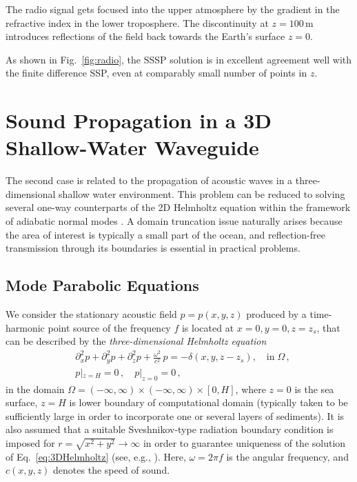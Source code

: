 \documentclass[11pt,a4paper]{article}
\theoremstyle{plain}%
\theoremstyle{definition}
\theoremstyle{remark}
\begin{document}
The radio signal gets focused into the upper atmosphere by the gradient in the refractive index in the lower troposphere.
The discontinuity at $z=100$\,m introduces reflections of the field back towards the Earth's surface $z=0$.

As shown in Fig.~\ref{fig:radio}, the SSSP solution is in excellent agreement well with the finite difference SSP, even at comparably small number of points in $z$.


\section{Sound Propagation in a 3D Shallow-Water Wave\-guide}\label{sec:sw_acoust}
The second case is related to the propagation of acoustic waves in a three-dimensional shallow water environment. 
This problem can be reduced to solving several one-way counterparts of the 2D Helmholtz equation within the framework of adiabatic normal modes \cite{jensen2011computational, PETROV2020115526}. 
A domain truncation issue naturally arises because the area of interest is typically a small part of the ocean, and reflection-free transmission through its boundaries is essential in practical problems.

\subsection{Mode Parabolic Equations}\label{sec:2MPE}

We consider the stationary acoustic field $p=p(x,y,z)$ produced by a time-harmonic point source of the frequency $f$ is located at $x=0, y=0, z=z_s$, that can be described by the \textit{three-dimensional Helmholtz equation} \cite{jensen2011computational}
\begin{equation}
    \begin{split}\label{eq:3DHelmholtz}
       &\partial_x^2 p + \partial_y^2 p + \partial_z^2 p + \frac{\omega^2}{c^2}  \,p
        = -\delta(x, y, z-z_s), \quad \mathrm{in}\; \Omega\,,\\
        & p|_{z=H} = 0\,,\quad p|_{z=0} = 0\,,
    \end{split}
\end{equation}
in the domain $\Omega = (-\infty,\infty) \times (-\infty, \infty) \times [0,H]$, 
where $z=0$ is the sea surface, $z=H$ is lower boundary of computational domain
(typically taken to be sufficiently large in order to incorporate one or several layers of sediments). 
It is also assumed that a suitable Sveshnikov-type radiation boundary condition is imposed for $r= \sqrt{x^2+y^2} \to \infty$ in order to guarantee uniqueness of the solution of Eq.~\eqref{eq:3DHelmholtz} (see, e.g., \cite{liu2013uniqueness}).
Here, $\omega = 2\pi f$ is the angular frequency, and $c(x,y,z)$ denotes the speed of sound.
\end{document}
